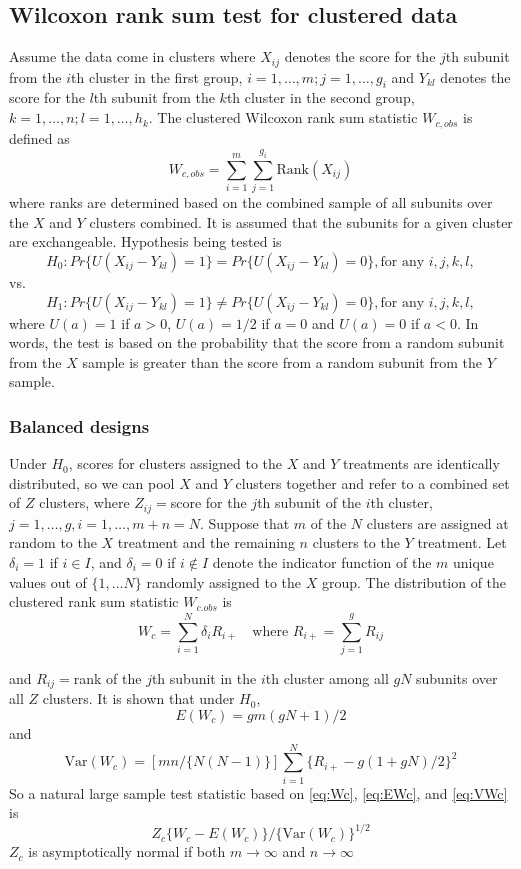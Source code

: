 \documentclass[12pt]{article}
\begin{document}
\subsection{Wilcoxon rank sum test for clustered data}
Assume the data come in clusters where $X_{ij}$ denotes the score for the $j$th subunit from the $i$th cluster in the first group, $i = 1,\ldots,m; j = 1,\ldots,g_i$ and $Y_{kl}$ denotes the score for the $l$th subunit from the $k$th cluster in the second group, $k=1, \ldots,n;l=1,\ldots,h_k$. The clustered Wilcoxon rank sum statistic $W_{c,obs}$ is defined as 
\begin{equation}
W_{c,obs} = \sum_{i=1}^m\sum_{j=1}^{g_i}\text{Rank}(X_{ij})
\end{equation}
where ranks are determined based on the combined sample of all subunits over the $X$ and $Y$ clusters combined. It is assumed that the subunits for a given cluster are exchangeable. Hypothesis being tested is 
$$H_0: Pr\{U(X_{ij} - Y_{kl}) = 1\} = Pr\{U(X_{ij} - Y_{kl}) = 0\}, \text{for any }i, j, k, l,$$
vs.$$H_1:Pr\{U(X_{ij} - Y_{kl}) = 1\} \not = Pr\{U(X_{ij} - Y_{kl}) = 0\}, \text{for any }i, j, k, l,$$
where $U(a) = 1$ if $a > 0$, $U(a) = 1/2$ if $a = 0$ and $U(a) = 0$ if $a < 0$.
In words, the test is based on the probability that the score from a random subunit from the $X$ sample is greater than the score from a random subunit from the $Y$ sample. 
\subsubsection{Balanced designs}\label{bal}
Under $H_0$, scores for clusters assigned to the $X$ and $Y$ treatments are identically distributed, so we can pool $X$ and $Y$ clusters together and refer to a combined set of $Z$ clusters, where $Z_{ij} = $score for the $j$th subunit of the $i$th cluster, $j = 1,\ldots,g,i=1,\ldots,m+n = N$. Suppose that $m$ of the $N$ clusters are assigned at random to the $X$ treatment and the remaining $n$ clusters to the $Y$ treatment. Let $\delta_i = 1$ if $i\in I$, and $\delta_i = 0$ if $i \not \in I$ denote the indicator function of the $m$ unique values out of $\{1, \ldots N\}$ randomly assigned to the $X$ group.  The distribution of the clustered rank sum statistic $W_{c.obs}$ is
\begin{equation}\label{eq:Wc}
W_c = \sum^N_{i=1}\delta_iR_{i+} \quad \text{where   }R_{i+} = \sum^g_{j=1}R_{ij}
\end{equation}

and $R_{ij}=$rank of the $j$th subunit in the $i$th cluster among all $gN$ subunits over all $Z$ clusters. It is shown that under $H_0$, 
\begin{equation}\label{eq:EWc}
E(W_c) = gm(gN + 1)/2
\end{equation}
and 
\begin{equation}\label{eq:VWc}
\text{Var}(W_c) = [mn/\{N(N-1)\}]\sum^N_{i=1}\{R_{i+} - g(1+gN)/2\}^2
\end{equation}
So a natural large sample test statistic based on \eqref{eq:Wc}, \eqref{eq:EWc}, and \eqref{eq:VWc} is \begin{equation}
Z_c \{W_c - E(W_c)\}/\{\text{Var}(W_c)\}^{1/2}
\end{equation}
$Z_c$ is asymptotically normal if both $m \to \infty$ and $n \to \infty$
\end{document}
